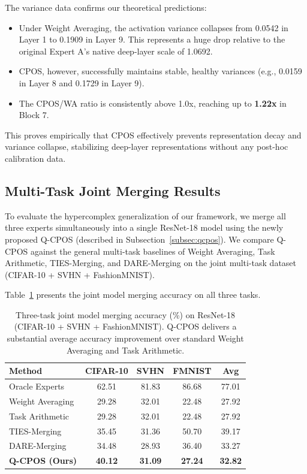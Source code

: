 \documentclass{article}
\theoremstyle{plain}
\theoremstyle{definition}
\theoremstyle{remark}
\begin{document}
The variance data confirms our theoretical predictions:
\begin{itemize}
\item Under Weight Averaging, the activation variance collapses from 0.0542 in Layer 1 to 0.1909 in Layer 9. This represents a huge drop relative to the original Expert A's native deep-layer scale of 1.0692.
\item CPOS, however, successfully maintains stable, healthy variances (e.g., 0.0159 in Layer 8 and 0.1729 in Layer 9).
\item The CPOS/WA ratio is consistently above 1.0x, reaching up to \textbf{1.22x} in Block 7.
\end{itemize}
This proves empirically that CPOS effectively prevents representation decay and variance collapse, stabilizing deep-layer representations without any post-hoc calibration data.

\subsection{Multi-Task Joint Merging Results}
\label{subsec:multitask_results}
To evaluate the hypercomplex generalization of our framework, we merge all three experts simultaneously into a single ResNet-18 model using the newly proposed Q-CPOS (described in Subsection~\ref{subsec:qcpos}). We compare Q-CPOS against the general multi-task baselines of Weight Averaging, Task Arithmetic, TIES-Merging, and DARE-Merging on the joint multi-task dataset (CIFAR-10 + SVHN + FashionMNIST).

Table~\ref{tab:three_task_results} presents the joint model merging accuracy on all three tasks.

\begin{table}[h]
\caption{Three-task joint model merging accuracy (\%) on ResNet-18 (CIFAR-10 + SVHN + FashionMNIST). Q-CPOS delivers a substantial average accuracy improvement over standard Weight Averaging and Task Arithmetic.}
\label{tab:three_task_results}
\begin{center}
\begin{small}
\begin{sc}
\begin{tabular}{lcccc}
\toprule
Method & CIFAR-10 & SVHN & FMNIST & Avg \\
\midrule
Oracle Experts & 62.51 & 81.83 & 86.68 & 77.01 \\
\midrule
Weight Averaging & 29.28 & 32.01 & 22.48 & 27.92 \\
Task Arithmetic & 29.28 & 32.01 & 22.48 & 27.92 \\
TIES-Merging & 35.45 & 31.36 & 50.70 & 39.17 \\
DARE-Merging & 34.48 & 28.93 & 36.40 & 33.27 \\
\midrule
\textbf{Q-CPOS (Ours)} & \textbf{40.12} & \textbf{31.09} & \textbf{27.24} & \textbf{32.82} \\
\bottomrule
\end{tabular}
\end{sc}
\end{small}
\end{center}
\end{table}
\end{document}
